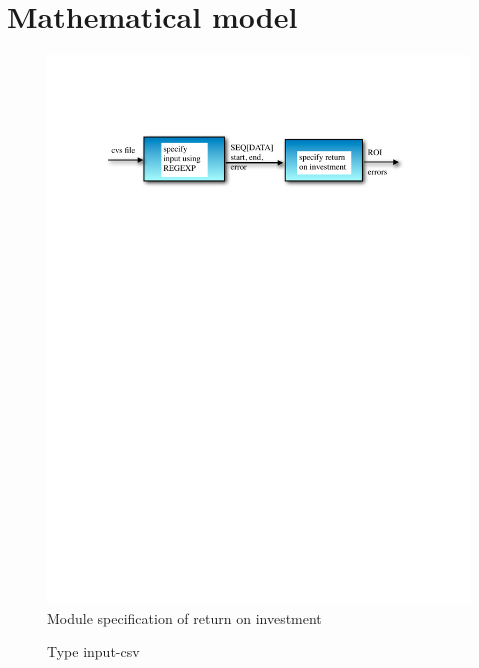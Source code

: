 \documentclass[runningheads,12pt]{article}
\begin{document}
\newpage

\section{Mathematical model}


\begin{figure}
\centering
\includegraphics[scale=0.8]{inputs/spec.pdf}

\caption{Module specification of return on investment}
\end{figure}

\begin{figure}

\caption{Type input-csv}
\label{fig:input}
\end{figure}

\newpage
\newcommand{\tab}{\hspace*{2em}}
\end{document}

